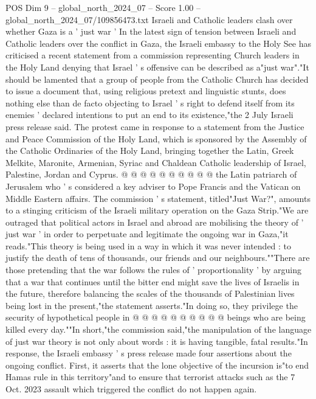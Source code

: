 \begin{textsample}{POS Dim 9 – global\_north\_2024\_07 – Score 1.00 – global\_north\_2024\_07/109856473.txt}  \label{ex:f9_pos_312}
Israeli and Catholic leaders clash over whether Gaza is a ' just war ' In the latest sign of tension between Israeli and Catholic leaders over the conflict in Gaza, the Israeli embassy to the Holy See has criticised a recent statement from a commission representing Church leaders in the Holy Land denying that Israel ' s offensive can be described as a"just war"."It should be lamented that a group of people from the Catholic Church has decided to issue a document that, using religious pretext and linguistic stunts, does nothing else than de facto objecting to Israel ' s right to defend itself from its enemies ' declared intentions to put an end to its existence,"the 2 July Israeli press release said.
The protest came in response to a statement from the Justice and Peace Commission of the Holy Land, which is sponsored by the Assembly of the Catholic Ordinaries of the Holy Land, bringing together the Latin, Greek Melkite, Maronite, Armenian, Syriac and Chaldean Catholic leadership of Israel, Palestine, Jordan and Cyprus. @ @ @ @ @ @ @ @ @ @ the Latin patriarch of Jerusalem who ' s considered a key adviser to Pope Francis and the Vatican on Middle Eastern affairs.
The commission ' s statement, titled"Just War?", amounts to a stinging criticism of the Israeli military operation on the Gaza Strip."We are outraged that political actors in Israel and abroad are mobilising the theory of ' just war ' in order to perpetuate and legitimate the ongoing war in Gaza,"it reads."This theory is being used in a way in which it was never intended : to justify the death of tens of thousands, our friends and our neighbours.""There are those pretending that the war follows the rules of ' proportionality ' by arguing that a war that continues until the bitter end might save the lives of Israelis in the future, therefore balancing the scales of the thousands of Palestinian lives being lost in the present,"the statement asserts."In doing so, they privilege the security of hypothetical people in @ @ @ @ @ @ @ @ @ @ beings who are being killed every day.""In short,"the commission said,"the manipulation of the language of just war theory is not only about words : it is having tangible, fatal results."In response, the Israeli embassy ' s press release made four assertions about the ongoing conflict.
First, it asserts that the lone objective of the incursion is"to end Hamas rule in this territory"and to ensure that terrorist attacks such as the 7 Oct. 2023 assault which triggered the conflict do not happen again.

\end{textsample}
